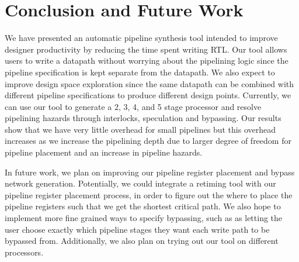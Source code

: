 \section{Conclusion and Future Work}
We have presented an automatic pipeline synthesis tool intended to
improve designer productivity by reducing the time spent writing
RTL. Our tool allows users to write a datapath without worrying about
the pipelining logic since the pipeline specification is kept separate
from the datapath. We also expect to improve design space exploration
since the same datapath can be combined with different pipeline
specifications to produce different design points. Currently, we can
use our tool to generate a 2, 3, 4, and 5 stage processor and resolve
pipelining hazards through interlocks, speculation and bypassing. Our
results show that we have very little overhead for small pipelines but
this overhead increases as we increase the pipelining depth due to
larger degree of freedom for pipeline placement and an increase in
pipeline hazards. 

In future work, we plan on improving our pipeline register placement
and bypass network generation. Potentially, we could integrate a
retiming tool with our pipeline register placement process, in order
to figure out the where to place the pipeline registers such that we
get the shortest critical path. We also hope to implement more fine
grained ways to specify bypassing, such as as letting the user choose
exactly which pipeline stages they want each write path to be bypassed
from. Additionally, we also plan on trying out our tool on different
processors. 
